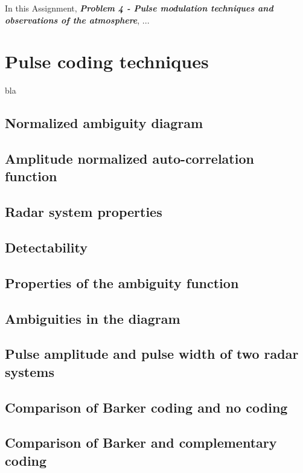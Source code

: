 

In this Assignment, \textit{\textbf{Problem 4 - Pulse modulation techniques and observations of the atmosphere}}, ...


\section{Pulse coding techniques}
bla

\subsection{Normalized ambiguity diagram}

\subsection{Amplitude normalized auto-correlation function}

\subsection{Radar system properties}

\subsection{Detectability}

\subsection{Properties of the ambiguity function}

\subsection{Ambiguities in the diagram}

\subsection{Pulse amplitude and pulse width of two radar systems}

\subsection{Comparison of Barker coding and no coding}

\subsection{Comparison of Barker and complementary coding}

